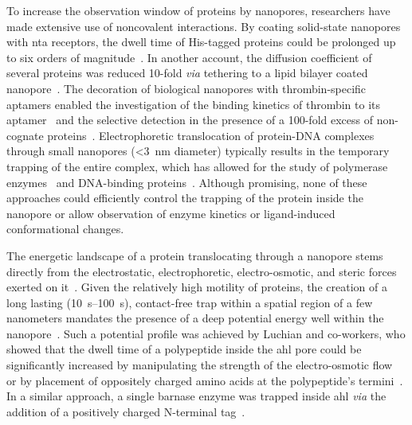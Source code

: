 To increase the observation window of proteins by nanopores, researchers have made extensive use of
noncovalent interactions. By coating solid-state nanopores with \gls{nta} receptors, the dwell time of
His-tagged proteins could be prolonged up to six orders of magnitude~\cite{Wei-2012}. In another account, the
diffusion coefficient of several proteins was reduced 10-fold \textit{via} tethering to a lipid bilayer coated
nanopore~\cite{Yusko-2011,Yusko-2017}. The decoration of biological nanopores with thrombin-specific aptamers
enabled the investigation of the binding kinetics of thrombin to its aptamer~\cite{Rotem-2012} and the
selective detection in the presence of a 100-fold excess of non-cognate proteins~\cite{Soskine-2012}.
Electrophoretic translocation of protein-DNA complexes through small nanopores (\SI{<3}{\nm} diameter)
typically results in the temporary trapping of the entire complex, which has allowed for the study of
polymerase enzymes~\cite{Lieberman-2010,Derrington-2015} and DNA-binding
proteins~\cite{Squires-2015,Yang-2018}. Although promising, none of these approaches could efficiently control
the trapping of the protein inside the nanopore or allow observation of enzyme kinetics or ligand-induced
conformational changes.

The energetic landscape of a protein translocating through a nanopore stems directly from the electrostatic,
electrophoretic, electro-osmotic, and steric forces exerted on it~\cite{Muthukumar-2014}. Given the relatively
high motility of proteins, the creation of a long lasting (\SIrange{10}{100}{\second}), contact-free trap
within a spatial region of a few nanometers mandates the presence of a deep potential energy well within the
nanopore~\cite{Movileanu-2005}. Such a potential profile was achieved by Luchian and co-workers, who showed
that the dwell time of a polypeptide inside the \gls{ahl} pore could be significantly increased by
manipulating the strength of the electro-osmotic flow~\cite{Mereuta-2014,Asandei-2016} or by placement of
oppositely charged amino acids at the polypeptide's termini~\cite{Asandei-2015}. In a similar approach, a
single barnase enzyme was trapped inside \gls{ahl} \textit{via} the addition of a positively charged
N-terminal tag~\cite{Mohammad-2008}.

